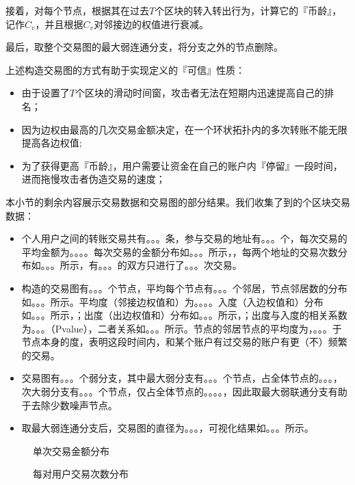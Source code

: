 接着，对每个节点，根据其在过去$T$个区块的转入转出行为，计算它的『币龄』，记作$C_v$，并且根据$C_v$对邻接边的权值进行衰减。

最后，取整个交易图的最大弱连通分支，将分支之外的节点删除。

上述构造交易图的方式有助于实现定义的『可信』性质：
\begin{itemize}
	\item 由于设置了$T$个区块的滑动时间窗，攻击者无法在短期内迅速提高自己的排名；
	\item 因为边权由最高的几次交易金额决定，在一个环状拓扑内的多次转账不能无限提高各边权值;
	\item 为了获得更高『币龄』，用户需要让资金在自己的账户内『停留』一段时间，进而拖慢攻击者伪造交易的速度；
\end{itemize}

本小节的剩余内容展示交易数据和交易图的部分结果。我们收集了到的个区块交易数据：
\begin{itemize}
	\item 个人用户之间的转账交易共有。。。条，参与交易的地址有。。。个，每次交易的平均金额为。。。。每次交易的金额分布如。。。所示，，每两个地址的交易次数分布如。。。所示，有。。。的双方只进行了。。。次交易。
	\item 构造的交易图有。。。个节点，平均每个节点有。。。个邻居，节点邻居数的分布如。。。所示。平均度（邻接边权值和）为。。。。入度（入边权值和）分布如。。。所示，；出度（出边权值和）分布如。。。所示，；出度与入度的相关系数为。。。（Pvalue），二者关系如。。。所示。节点的邻居节点的平均度为，。。。于节点本身的度，表明这段时间内，和某个账户有过交易的账户有更（不）频繁的交易。
	\item 交易图有。。。个弱分支，其中最大弱分支有。。。个节点，占全体节点的。。。，次大弱分支有。。。个节点，仅占全体节点的。。。。，因此取最大弱联通分支有助于去除少数噪声节点。
	\item 取最大弱连通分支后，交易图的直径为。。。，可视化结果如。。。所示。
\end{itemize}

\begin{figure}
	
	\caption{单次交易金额分布}\label{fig:txad}
\end{figure}

\begin{figure}
	
	\caption{每对用户交易次数分布}\label{fig:txnd}
\end{figure}

